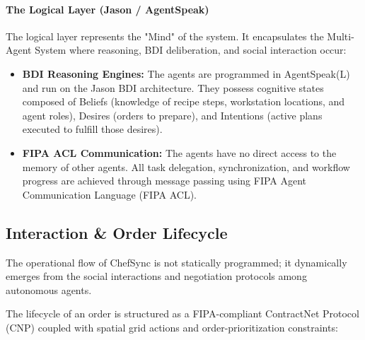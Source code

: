 \documentclass{scrartcl}
\begin{document}
\paragraph{The Logical Layer (Jason / AgentSpeak)}
The logical layer represents the "Mind" of the system. It encapsulates the Multi-Agent System where reasoning, BDI deliberation, and social interaction occur:
\begin{itemize}
\item \textbf{BDI Reasoning Engines:} The agents are programmed in AgentSpeak(L) and run on the Jason BDI architecture. They possess cognitive states composed of Beliefs (knowledge of recipe steps, workstation locations, and agent roles), Desires (orders to prepare), and Intentions (active plans executed to fulfill those desires).
\item \textbf{FIPA ACL Communication:} The agents have no direct access to the memory of other agents. All task delegation, synchronization, and workflow progress are achieved through message passing using FIPA Agent Communication Language (FIPA ACL).
\end{itemize}


\subsection{Interaction \& Order Lifecycle}

The operational flow of ChefSync is not statically programmed; it dynamically emerges from the social interactions and negotiation protocols among autonomous agents.

The lifecycle of an order is structured as a FIPA-compliant ContractNet Protocol (CNP) coupled with spatial grid actions and order-prioritization constraints:
\end{document}
